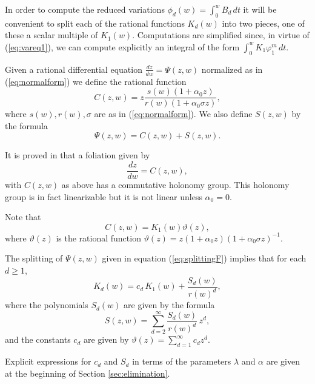 In order to compute the reduced variations $\phi_d(w)=\int_0^wB_d\,dt$ it will be convenient to split each of the rational functions $K_d(w)$ into two pieces, one of these a scalar multiple of $K_1(w)$. Computations are simplified since, in virtue of (\ref{eq:vareq1}), we can compute explicitly an integral of the form $\int_{0}^{w}K_1\varphi_1^m\,dt$.

\begin{definition}\label{def:splittingF}
Given a rational differential equation $\displaystyle\frac{dz}{dw}=\Psi(z,w)$ normalized as in \textnormal{(\ref{eq:normalform})} we define the rational function
\[ C(z,w)=z\frac{s(w)(1+\alpha_0 z)}{r(w)(1+\alpha_0\sigma z)}, \]
where $s(w),r(w),\sigma$ are as in \textnormal{(\ref{eq:normalform})}. We also define $S(z,w)$ by the formula 
\begin{equation}\label{eq:splittingF}
\Psi(z,w)=C(z,w)+S(z,w). 
\end{equation}
\end{definition}

\begin{remark}
It is proved in \cite{Pyartli2000} that a foliation given by 
\[ \frac{dz}{dw}=C(z,w), \]
with $C(z,w)$ as above has a commutative holonomy group. This holonomy group is in fact linearizable but it is not linear unless $\alpha_0=0$.
\end{remark}

Note that
\[ C(z,w)=K_1(w)\vartheta(z), \]
where $\vartheta(z)$ is the rational function $\vartheta(z)=z(1+\alpha_0 z)(1+\alpha_0\sigma z)^{-1}$. 

\begin{proposition}\label{prop:c_dS_d}
The splitting of $\Psi(z,w)$ given in equation \textnormal{(\ref{eq:splittingF})} implies that for each $d\geq1$,
\begin{equation}\label{eq:c_dS_d}
K_d(w)=c_d\,K_1(w)+\frac{S_d(w)}{r(w)^d},
\end{equation}
where the polynomials $S_d(w)$ are given by the formula
\[ S(z,w)=\sum_{d=2}^{\infty}\frac{S_d(w)}{r(w)^{d}}\,z^d, \]
and the constants $c_d$ are given by $\vartheta(z)=\sum_{d=1}^\infty c_dz^d.$
\end{proposition}

Explicit expressions for $c_d$ and $S_d$ in terms of the parameters $\lambda$ and $\alpha$ are given at the beginning of Section \ref{sec:elimination}.

